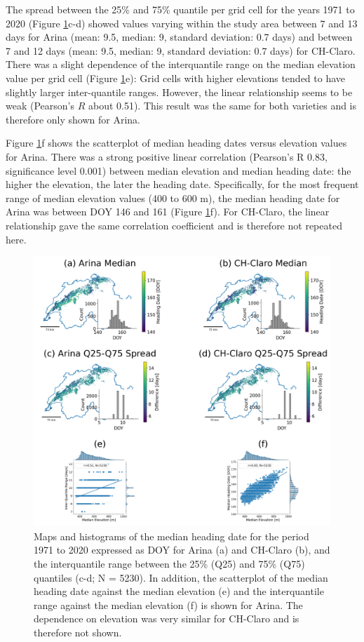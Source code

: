 The spread between the 25\% and 75\% quantile per grid cell for the years 1971 to 2020 (Figure \ref{fig:median-heading-map}c-d) showed values varying within the study area between 7 and 13 days for Arina (mean: 9.5, median: 9, standard deviation: 0.7 days) and between 7 and 12 days (mean: 9.5, median: 9, standard deviation: 0.7 days) for CH-Claro. There was a slight dependence of the interquantile range on the median elevation value per grid cell (Figure \ref{fig:median-heading-map}e): Grid cells with higher elevations tended to have slightly larger inter-quantile ranges. However, the linear relationship seems to be weak (Pearson's $R$ about 0.51). This result was the same for both varieties and is therefore only shown for Arina.

Figure \ref{fig:median-heading-map}f shows the scatterplot of median heading dates versus elevation values for Arina. There was a strong positive linear correlation (Pearson's R 0.83, significance level 0.001) between median elevation and median heading date: the higher the elevation, the later the heading date. Specifically, for the most frequent range of median elevation values (400 to 600 m), the median heading date for Arina was between \gls{DOY} 146 and 161 (Figure \ref{fig:median-heading-map}f). For CH-Claro, the linear relationship gave the same correlation coefficient and is therefore not repeated here.

\begin{figure}[H]
    \centering
    \includegraphics[width=\textwidth]{03-Heading-Dates/img/stats_map.png}
    \caption{Maps and histograms of the median heading date for the period 1971 to 2020 expressed as \gls{DOY} for Arina (a) and CH-Claro (b), and the interquantile range between the 25\% (Q25) and 75\% (Q75) quantiles (c-d; N = 5230). In addition, the scatterplot of the median heading date against the median elevation (e) and the interquantile range against the median elevation (f) is shown for Arina. The dependence on elevation was very similar for CH-Claro and is therefore not shown.}
    \label{fig:median-heading-map}
\end{figure}


